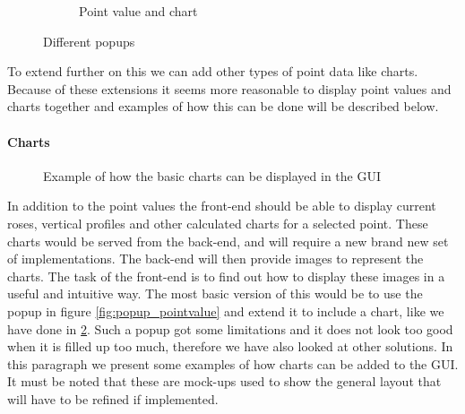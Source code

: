 \documentclass[11pt,a4paper,titlepage,oneside]{report}
\begin{document}
\begin{figure}[h]
{\begin{subfigure}[b]{0.48\textwidth}
    \caption{Point value and chart}
    \label{fig:popup_chart}
  \end{subfigure}
}
\caption{Different popups}
\end{figure}
To extend further on this we can add other types of point data like charts. Because of these extensions it seems more reasonable to display point values and charts together and examples of how this can be done will be described below.

\paragraph{Charts}
\begin{figure}[!htb]
  \begin{center}
    \caption{Example of how the basic charts can be displayed in the GUI}
    \label{fig:gui_basicChart}
  \end{center}
\end{figure}
In addition to the point values the \gls{front-end} should be able to display current roses, vertical profiles and other calculated charts for a selected point. These charts would be served from the \gls{back-end}, and will require a new brand new set of implementations. The \gls{back-end} will then provide images to represent the charts. The task of the \gls{front-end} is to find out how to display these images in a useful and intuitive way. The most basic version of this would be to use the popup in figure \ref{fig:popup_pointvalue} and extend it to include a chart, like we have done in \ref{fig:popup_chart}. Such a popup got some limitations and it does not look too good when it is filled up too much, therefore we have also looked at other solutions. 
In this paragraph we present some examples of how charts can be added to the \gls{GUI}. It must be noted that these are mock-ups used to show the general layout that will have to be refined if implemented.
\end{document}

